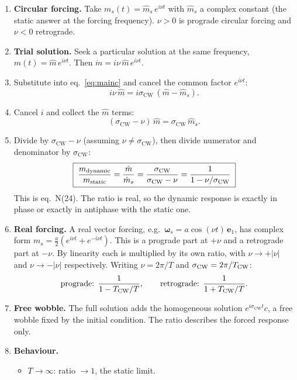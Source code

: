 \documentclass[11pt,a4paper]{article}
\newcommand{\bw}{\bm{\omega}}
\newcommand{\be}{\mathbf{e}}
\newcommand{\scw}{\sigma_{\mathrm{CW}}}
\begin{document}
\begin{enumerate}
  \item \textbf{Circular forcing.} Take $m_s(t)=\hat m_s\,e^{i\nu t}$ with $\hat m_s$ a complex constant
  (the static answer at the forcing frequency). $\nu>0$ is prograde circular forcing and $\nu<0$
  retrograde.
  \item \textbf{Trial solution.} Seek a particular solution at the same frequency,
  $m(t)=\hat m\,e^{i\nu t}$. Then $\dot m=i\nu\,\hat m\,e^{i\nu t}$.
  \item Substitute into eq.~\eqref{eq:mainc} and cancel the common factor $e^{i\nu t}$:
  \begin{equation}
    i\nu\,\hat m=i\scw\,(\hat m-\hat m_s).
  \end{equation}
  \item Cancel $i$ and collect the $\hat m$ terms:
  \begin{equation}
    (\scw-\nu)\,\hat m=\scw\,\hat m_s .
  \end{equation}
  \item Divide by $\scw-\nu$ (assuming $\nu\neq\scw$), then divide numerator and denominator by $\scw$:
  \begin{equation}
    \boxed{\;\frac{m_{\rm dynamic}}{m_{\rm static}}=\frac{\hat m}{\hat m_s}=\frac{\scw}{\scw-\nu}=\frac{1}{1-\nu/\scw}\;}
    \label{eq:ratio}
  \end{equation}
  This is eq.~N(24). The ratio is real, so the dynamic response is exactly in phase or exactly in
  antiphase with the static one.
  \item \textbf{Real forcing.} A real vector forcing, e.g.\ $\bw_s=a\cos(\nu t)\,\be_1$, has
  complex form $m_s=\tfrac a2(e^{i\nu t}+e^{-i\nu t})$. This is a prograde part at $+\nu$ and a
  retrograde part at $-\nu$. By linearity each is multiplied by its own ratio, with $\nu\to+|\nu|$ and
  $\nu\to-|\nu|$ respectively. Writing $\nu=2\pi/T$ and $\scw=2\pi/T_{\rm CW}$:
  \begin{equation}
    \text{prograde: }\frac{1}{1-T_{\rm CW}/T},\qquad
    \text{retrograde: }\frac{1}{1+T_{\rm CW}/T}.
  \end{equation}
  \item \textbf{Free wobble.} The full solution adds the homogeneous solution $e^{i\scw t}c$, a free
  wobble fixed by the initial condition. The ratio describes the forced response only.
  \item \textbf{Behaviour.}
  \begin{itemize}
    \item $T\to\infty$: ratio $\to1$, the static limit.

\end{itemize}
\end{enumerate}
\end{document}
